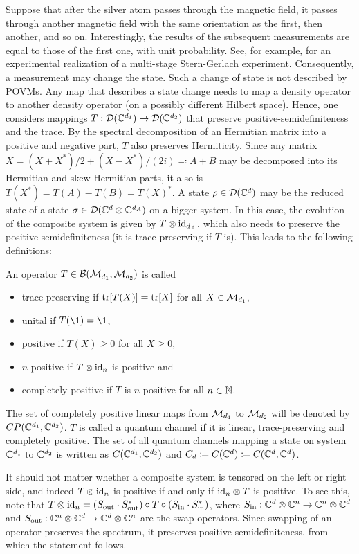 Suppose that after the silver atom passes through the magnetic field, it passes through another magnetic field with the same orientation as the first, then another, and so on. Interestingly, the results of the subsequent measurements are equal to those of the first one, with unit probability. See, for example, \cite{Frisch1933} for an experimental realization of a multi-stage Stern-Gerlach experiment. Consequently, a measurement may change the state. Such a change of state is not described by POVMs. Any map that describes a state change needs to map a density operator to another density operator (on a possibly different Hilbert space). Hence, one considers mappings $T:\mathcal D(\mathbb{C}^{d_1}) \rightarrow \mathcal D(\mathbb{C}^{d_2})$ that preserve positive-semidefiniteness and the trace. By the spectral decomposition of an Hermitian matrix into a positive and negative part, $T$ also preserves Hermiticity. Since any matrix $X = (X+X^*)/2+(X-X^*)/(2i)\eqqcolon A+B$ may be decomposed into its Hermitian and skew-Hermitian parts, it also is $T(X^*)=T(A)-T(B)=T(X)^*$. A state $\rho \in \mathcal D(\mathbb{C}^d)$ may be the reduced state of a state $\sigma \in \mathcal D(\mathbb{C}^d \otimes \mathbb{C}^{d_A})$ on a bigger system. In this case, the evolution of the composite system is given by $T\otimes \mathrm{id}_{d_A}$, which also needs to preserve the positive-semidefiniteness (it is trace-preserving if $T$ is). This leads to the following definitions:
\begin{definition}An operator $T\in \mathcal B(\mathcal M_{d_1},\mathcal M_{d_2})$ is called 
\begin{itemize}
    \item trace-preserving if $\mathrm{tr}[T(X)]= \mathrm{tr}[X]$ for all $X\in \mathcal M_{d_1}$,
    \item unital if $T(\1) = \1$,
    \item positive if $T(X)\geq 0$ for all $X \geq 0$,
    \item $n$-positive if $T\otimes \mathrm{id}_n$ is positive and
    \item completely positive if $T$ is $n$-positive for all $n\in \mathbb{N}$.
\end{itemize}
The set of completely positive linear maps from $\mathcal M_{d_1}$ to $\mathcal M_{d_2}$ will be denoted by $ {CP}(\mathbb{C}^{d_1}, \mathbb{C}^{d_2})$. $T$ is called a quantum channel if it is linear, trace-preserving and completely positive. The set of all quantum channels mapping a state on system $\mathbb{C}^{d_1}$ to $\mathbb{C}^{d_2}$ is written as $C(\mathbb{C}^{d_1}, \mathbb{C}^{d_2})$ and $C_d \coloneqq C(\mathbb{C}^d) \coloneqq  C(\mathbb{C}^d,\mathbb{C}^d)$. 
\end{definition}
It should not matter whether a composite system is tensored on the left or right side, and indeed $T\otimes \mathrm{id}_n$ is positive if and only if $\mathrm{id}_n \otimes T$ is positive. To see this, note that $T\otimes \mathrm{id}_n = (S_\text{out} \cdot S_\text{out}^*)\circ T \circ (S_\text{in} \cdot S_\text{in}^*)$, where $S_\text{in}:\mathbb{C}^d\otimes \mathbb{C}^{n}\rightarrow \mathbb{C}^{n}\otimes \mathbb{C}^{d}$ and $S_\text{out}:\mathbb{C}^{n}\otimes \mathbb{C}^{d}\rightarrow \mathbb{C}^{d}\otimes \mathbb{C}^{n}$ are the swap operators. Since swapping of an operator preserves the spectrum, it preserves positive semidefiniteness, from which the statement follows.

